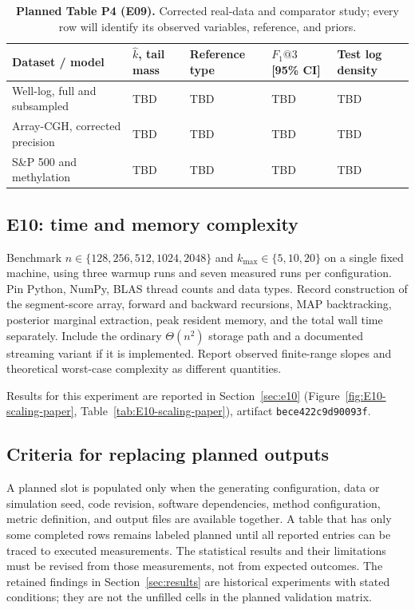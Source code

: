 \begin{table}[!htbp]
\centering\small
\caption{\textbf{Planned Table P4 (E09).} Corrected real-data and comparator
study; every row will identify its observed variables, reference, and priors.}
\label{tab:planned-external-paper}
\begin{tabularx}{0.94\textwidth}{@{}L{0.23\textwidth}L{0.17\textwidth}L{0.18\textwidth}L{0.19\textwidth}Y@{}}
\toprule
Dataset / model & $\widehat k$, tail mass & Reference type & $F_1@3$ [95\% CI] & Test log density \\
\midrule
Well-log, full and subsampled & TBD & TBD & TBD & TBD \\
Array-CGH, corrected precision & TBD & TBD & TBD & TBD \\
S\&P 500 and methylation & TBD & TBD & TBD & TBD \\
\bottomrule
\end{tabularx}
\end{table}

\subsection{E10: time and memory complexity}
Benchmark $n\in\{128,256,512,1024,2048\}$ and
$k_{\max}\in\{5,10,20\}$ on a single fixed machine, using three warmup
runs and seven measured runs per configuration. Pin Python, NumPy, BLAS
thread counts and data types. Record construction of the segment-score array,
forward and backward recursions, MAP backtracking, posterior marginal
extraction, peak resident memory, and the total wall time separately. Include
the ordinary $\Theta(n^2)$ storage path and a documented streaming variant if
it is implemented. Report observed finite-range slopes and theoretical
worst-case complexity as different quantities.

Results for this experiment are reported in Section~\ref{sec:e10} (Figure~\ref{fig:E10-scaling-paper}, Table~\ref{tab:E10-scaling-paper}), artifact \texttt{bece422c9d90093f}.

\subsection{Criteria for replacing planned outputs}
A planned slot is populated only when the generating configuration, data or
simulation seed, code revision, software dependencies, method configuration,
metric definition, and output files are available together. A table that has
only some completed rows remains labeled planned until all reported entries
can be traced to executed measurements. The statistical results and their
limitations must be revised from those measurements, not from expected
outcomes. The retained findings in Section~\ref{sec:results} are historical
experiments with stated conditions; they are not the unfilled cells in the
planned validation matrix.
